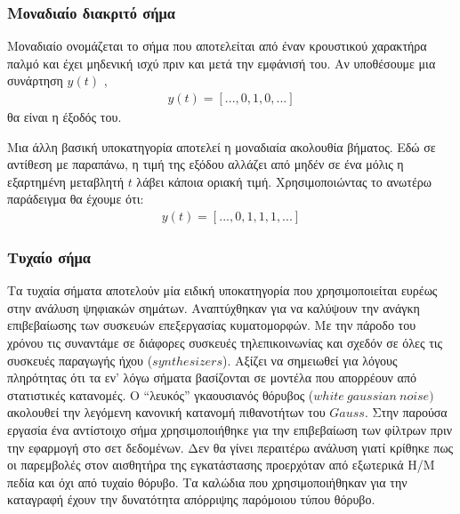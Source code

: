 \documentclass[breaklines=true, 12pt]{article}
\begin{document}
\subsubsection{Μοναδιαίο διακριτό σήμα}
\label{sec:org31be2f7}
Μοναδιαίο ονομάζεται το σήμα που αποτελείται από έναν κρουστικού
χαρακτήρα παλμό και έχει μηδενική ισχύ πριν και μετά την εμφάνισή
του. Αν υποθέσουμε μια συνάρτηση \(y(t)\) ,
\begin{equation}
\begin{align}
y(t) = [..., 0, 1, 0, ...]
\end{align}
\end{equation}
θα είναι η έξοδός του.

Μια άλλη βασική υποκατηγορία αποτελεί η μοναδιαία ακολουθία βήματος.
Εδώ σε αντίθεση με παραπάνω, η τιμή της εξόδου αλλάζει από μηδέν σε ένα
μόλις η εξαρτημένη μεταβλητή \(t\) λάβει κάποια οριακή τιμή.
Χρησιμοποιώντας το ανωτέρω παράδειγμα θα έχουμε ότι:
\begin{equation}
\begin{align}
y(t) = [..., 0, 1, 1, 1, ...]
\end{align}
\end{equation}
\subsubsection{Τυχαίο σήμα}
\label{sec:orgf445dea}
Τα τυχαία σήματα αποτελούν μία ειδική υποκατηγορία που χρησιμοποιείται
ευρέως στην ανάλυση ψηφιακών σημάτων. Αναπτύχθηκαν για να καλύψουν την
ανάγκη επιβεβαίωσης των συσκευών επεξεργασίας κυματομορφών. Με την
πάροδο του χρόνου τις συναντάμε σε διάφορες συσκευές τηλεπικοινωνίας
και σχεδόν σε όλες τις συσκευές παραγωγής ήχου (\(synthesizers\)).
Αξίζει να σημειωθεί για λόγους πληρότητας ότι τα εν' λόγω σήματα
βασίζονται σε μοντέλα που απορρέουν από στατιστικές κατανομές.
Ο “λευκός” γκαουσιανός θόρυβος (\(white\ gaussian\ noise)\) ακολουθεί
την λεγόμενη κανονική κατανομή πιθανοτήτων του \(Gauss\). Στην παρούσα
εργασία ένα αντίστοιχο σήμα χρησιμοποιήθηκε για την επιβεβαίωση των
φίλτρων πριν την εφαρμογή στο σετ δεδομένων. Δεν θα γίνει περαιτέρω
ανάλυση γιατί κρίθηκε πως οι παρεμβολές στον αισθητήρα της εγκατάστασης
προερχόταν από εξωτερικά Η/Μ πεδία και όχι από τυχαίο θόρυβο. Τα καλώδια
που χρησιμοποιήθηκαν για την καταγραφή έχουν την δυνατότητα απόρριψης
παρόμοιου τύπου θόρυβο.
\end{document}
